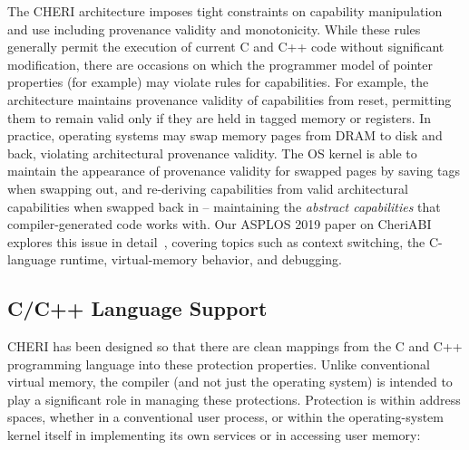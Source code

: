 The CHERI architecture imposes tight constraints on capability manipulation and
use including provenance validity and monotonicity.
While these rules generally permit the execution of current C and C++ code
without significant modification, there are occasions on which the
programmer model of pointer properties (for example) may violate rules for
capabilities.
For example, the architecture maintains provenance validity of capabilities
from reset, permitting them to remain valid only if they are held in tagged
memory or registers.
In practice, operating systems may swap memory pages from DRAM to disk and
back, violating architectural provenance validity.
The OS kernel is able to maintain the appearance of provenance validity for
swapped pages by saving tags when swapping out, and re-deriving capabilities
from valid architectural capabilities when swapped back in -- maintaining the
\textit{abstract capabilities} that compiler-generated code works with.
Our ASPLOS 2019 paper on CheriABI explores this issue in
detail~\cite{davis2019:cheriabi}, covering topics such as context switching,
the C-language runtime, virtual-memory behavior, and debugging.

\subsection{C/C++ Language Support}

CHERI has been designed so that there are clean mappings from the C and C++
programming language into these protection properties.  Unlike
conventional virtual memory, the compiler (and not just the operating system)
is intended to play a significant role in managing these protections.
Protection is within address spaces, whether in a conventional user
process, or within the operating-system kernel itself in implementing its own
services or in accessing user memory:

